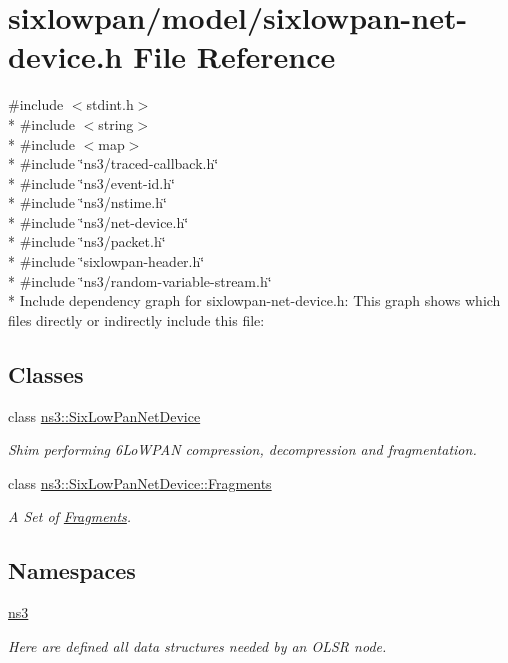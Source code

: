 \hypertarget{sixlowpan-net-device_8h}{}\section{sixlowpan/model/sixlowpan-\/net-\/device.h File Reference}
\label{sixlowpan-net-device_8h}
{\ttfamily \#include $<$stdint.\+h$>$}\\*
{\ttfamily \#include $<$string$>$}\\*
{\ttfamily \#include $<$map$>$}\\*
{\ttfamily \#include \char`\"{}ns3/traced-\/callback.\+h\char`\"{}}\\*
{\ttfamily \#include \char`\"{}ns3/event-\/id.\+h\char`\"{}}\\*
{\ttfamily \#include \char`\"{}ns3/nstime.\+h\char`\"{}}\\*
{\ttfamily \#include \char`\"{}ns3/net-\/device.\+h\char`\"{}}\\*
{\ttfamily \#include \char`\"{}ns3/packet.\+h\char`\"{}}\\*
{\ttfamily \#include \char`\"{}sixlowpan-\/header.\+h\char`\"{}}\\*
{\ttfamily \#include \char`\"{}ns3/random-\/variable-\/stream.\+h\char`\"{}}\\*
Include dependency graph for sixlowpan-\/net-\/device.h\+:
This graph shows which files directly or indirectly include this file\+:
\subsection*{Classes}
\begin{DoxyCompactItemize}
\item 
class \hyperlink{classns3_1_1SixLowPanNetDevice}{ns3\+::\+Six\+Low\+Pan\+Net\+Device}
\begin{DoxyCompactList}\small\item\em Shim performing 6\+Lo\+W\+P\+AN compression, decompression and fragmentation. \end{DoxyCompactList}\item 
class \hyperlink{classns3_1_1SixLowPanNetDevice_1_1Fragments}{ns3\+::\+Six\+Low\+Pan\+Net\+Device\+::\+Fragments}
\begin{DoxyCompactList}\small\item\em A Set of \hyperlink{classns3_1_1SixLowPanNetDevice_1_1Fragments}{Fragments}. \end{DoxyCompactList}\end{DoxyCompactItemize}
\subsection*{Namespaces}
\begin{DoxyCompactItemize}
\item 
 \hyperlink{namespacens3}{ns3}
\begin{DoxyCompactList}\small\item\em Here are defined all data structures needed by an O\+L\+SR node. \end{DoxyCompactList}\end{DoxyCompactItemize}
